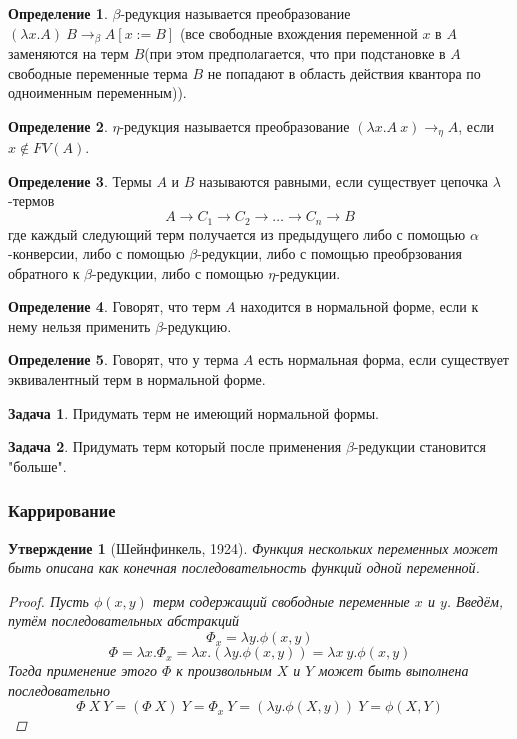 \documentclass[10pt,twoside]{article}
\theoremstyle{plain}
\newtheorem{ass}{Утверждение}
\theoremstyle{definition}
\newtheorem{defi}{Определение}
\newtheorem{problem}{Задача}
\begin{document}
\begin{defi}
  $\beta$-редукция называется преобразование $(\lambda x.A)\ B\to_\beta A[x:=B]$ (все свободные вхождения переменной $x$ в $A$ заменяются на терм $B$(при этом предполагается, что при подстановке в $A$ свободные переменные терма $B$ не попадают в область действия квантора по одноименным переменным)).
\end{defi}

\begin{defi}
  $\eta$-редукция называется преобразование $(\lambda x.A\ x)\to_\eta A$, если $x\notin FV(A)$.
\end{defi}

\begin{defi}
  Термы $A$ и $B$ называются равными, если существует цепочка $\lambda$-термов
  $$A\to C_1\to C_2 \to \dots\to C_n\to B$$
  где каждый следующий терм получается из предыдущего либо с помощью $\alpha$-конверсии, либо с помощью $\beta$-редукции, либо с помощью преобрзования обратного к $\beta$-редукции, либо с помощью $\eta$-редукции.
\end{defi}

\begin{defi}
  Говорят, что терм $A$ находится в нормальной форме, если к нему нельзя применить $\beta$-редукцию.
\end{defi}

\begin{defi}
  Говорят, что у терма $A$ есть нормальная форма, если существует эквивалентный терм в нормальной форме.
\end{defi}

\begin{problem}
  Придумать терм не имеющий нормальной формы.
\end{problem}

\begin{problem}
  Придумать терм который после применения $\beta$-редукции становится "больше".
\end{problem}

\subsubsection{Каррирование}

\begin{ass}[Шейнфинкель, 1924]
  Функция нескольких переменных может быть описана как конечная последовательность функций одной переменной.
  \begin{proof}
    Пусть $\phi(x,y)$ терм содержащий свободные переменные $x$ и $y$. Введём, путём последовательных абстракций
    $$\Phi_x = \lambda y.\phi(x,y)$$
    $$\Phi = \lambda x.\Phi_x = \lambda x.(\lambda y. \phi(x,y)) = \lambda x\ y.\phi(x,y)$$
    Тогда применение этого $\Phi$ к произвольным $X$ и $Y$ может быть выполнена последовательно
    $$\Phi\ X\ Y = (\Phi\ X)\ Y=\Phi_x\ Y=(\lambda y.\phi(X,y))\ Y=\phi(X,Y)$$
  \end{proof}
\end{ass}
\end{document}
